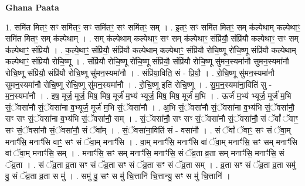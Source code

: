 \documentclass[17pt]{extarticle}
\begin{document}
\textbf{Ghana Paata } \newline

1. समि॑त मितꣳ॒॒ सꣳ समि॑तꣳ॒॒ सꣳ समि॑तꣳ॒॒ सꣳ समि॑तꣳ॒॒ सम् । . इ॒तꣳ॒॒ सꣳ समि॑त मितꣳ॒॒ सम् क॑ल्पेथाम् कल्पेथाꣳ॒॒ समि॑त मितꣳ॒॒ सम् क॑ल्पेथाम् । . सम् क॑ल्पेथाम् कल्पेथाꣳ॒॒ सꣳ सम् क॑ल्पेथाꣳ॒॒ संप्रि॑यौ॒ संप्रि॑यौ कल्पेथाꣳ॒॒ सꣳ सम् क॑ल्पेथाꣳ॒॒ संप्रि॑यौ । . क॒ल्पे॒थाꣳ॒॒ संप्रि॑यौ॒ संप्रि॑यौ कल्पेथाम् कल्पेथाꣳ॒॒ संप्रि॑यौ रोचि॒ष्णू रो॑चि॒ष्णू संप्रि॑यौ कल्पेथाम् कल्पेथाꣳ॒॒ संप्रि॑यौ रोचि॒ष्णू । . संप्रि॑यौ रोचि॒ष्णू रो॑चि॒ष्णू संप्रि॑यौ॒ संप्रि॑यौ रोचि॒ष्णू सु॑मन॒स्यमा॑नौ सुमन॒स्यमा॑नौ रोचि॒ष्णू संप्रि॑यौ॒ संप्रि॑यौ रोचि॒ष्णू सु॑मन॒स्यमा॑नौ । . संप्रि॑या॒विति॒ सं - प्रि॒यौ॒ । . रो॒चि॒ष्णू सु॑मन॒स्यमा॑नौ सुमन॒स्यमा॑नौ रोचि॒ष्णू रो॑चि॒ष्णू सु॑मन॒स्यमा॑नौ । . रो॒चि॒ष्णू इति॑ रोचि॒ष्णू । . सु॒म॒न॒स्यमा॑ना॒विति॑ सु - म॒न॒स्यमा॑नौ । . इष॒ मूर्ज॒ मूर्ज॒ मिष॒ मिष॒ मूर्ज॑ म॒भ्य॑ भ्यूर्ज॒ मिष॒ मिष॒ मूर्ज॑ म॒भि । . ऊर्ज॑ म॒भ्य॑ भ्यूर्ज॒ मूर्ज॑ म॒भि सं॒ॅवसा॑नौ सं॒ॅवसा॑ना व॒भ्यूर्ज॒ मूर्ज॑ म॒भि सं॒ॅवसा॑नौ । . अ॒भि सं॒ॅवसा॑नौ सं॒ॅवसा॑ना व॒भ्य॑भि सं॒ॅवसा॑नौ॒ सꣳ सꣳ सं॒ॅवसा॑ना व॒भ्य॑भि सं॒ॅवसा॑नौ॒ सम् । . सं॒ॅवसा॑नौ॒ सꣳ सꣳ सं॒ॅवसा॑नौ सं॒ॅवसा॑नौ॒ सं ॅवां᳚ ॅवाꣳ॒॒ सꣳ सं॒ॅवसा॑नौ सं॒ॅवसा॑नौ॒ सं ॅवा᳚म् । . सं॒ॅवसा॑ना॒विति॑ सं - वसा॑नौ । . सं ॅवां᳚ ॅवाꣳ॒॒ सꣳ सं ॅवा॒म् मनाꣳ॑सि॒ मनाꣳ॑सि वाꣳ॒॒ सꣳ सं ॅवा॒म् मनाꣳ॑सि । . वा॒म् मनाꣳ॑सि॒ मनाꣳ॑सि वां ॅवा॒म् मनाꣳ॑सि॒ सꣳ सम् मनाꣳ॑सि वां ॅवा॒म् मनाꣳ॑सि॒ सम् । . मनाꣳ॑सि॒ सꣳ सम् मनाꣳ॑सि॒ मनाꣳ॑सि॒ सं ॅव्र॒ता व्र॒ता सम् मनाꣳ॑सि॒ मनाꣳ॑सि॒ सं ॅव्र॒ता । . सं ॅव्र॒ता व्र॒ता सꣳ सं ॅव्र॒ता सꣳ सं ॅव्र॒ता सꣳ सं ॅव्र॒ता सम् । . व्र॒ता सꣳ सं ॅव्र॒ता व्र॒ता समु॑ वु॒ सं ॅव्र॒ता व्र॒ता स मु॑ । . समु॑ वु॒ सꣳ स मु॑ चि॒त्तानि॑ चि॒त्तान्यु॒ सꣳ स मु॑ चि॒त्तानि॑ । \newline
\end{document}

